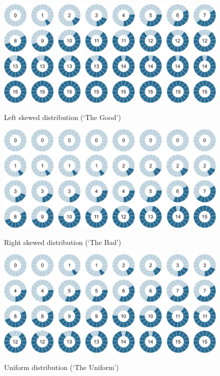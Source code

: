 \begin{figure}[h!]
  \centering
 {\includegraphics[width=0.95\linewidth]{Left_15.png}}
  \caption{Left skewed distribution (`The Good')}
  \label{fig:thegood}
\end{figure}


\begin{figure}[h!]
  \centering
 {\includegraphics[width=0.95\linewidth]{Right_15.png}}
  \caption{Right skewed distribution (`The Bad')}
  \label{fig:thebad}
\end{figure}


\begin{figure}[h!]
  \centering
 {\includegraphics[width=0.95\linewidth]{Uniform_15.png}}
  \caption{Uniform distribution (`The Uniform')}
  \label{fig:theuniform}
\end{figure}

